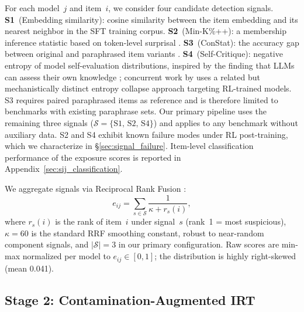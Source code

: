 For each model~$j$ and item~$i$, we consider four candidate detection signals. \textbf{S1}~(Embedding similarity): cosine similarity between the item embedding and its nearest neighbor in the SFT training corpus. \textbf{S2}~(Min-K\%++): a membership inference statistic based on token-level surprisal \citep{zhang_2024_minkpp}. \textbf{S3}~(ConStat): the accuracy gap between original and paraphrased item variants \citep{dekoninck2024constat}. \textbf{S4}~(Self-Critique): negative entropy of model self-evaluation distributions, inspired by the finding that LLMs can assess their own knowledge \citep{kadavath2022}; concurrent work by \citet{tao2025detecting} uses a related but mechanistically distinct entropy collapse approach targeting RL-trained models. S3 requires paired paraphrased items as reference and is therefore limited to benchmarks with existing paraphrase sets. Our primary pipeline uses the remaining three signals ($\mathcal{S} = \{\text{S1, S2, S4}\}$) and applies to any benchmark without auxiliary data. S2 and S4 exhibit known failure modes under RL post-training, which we characterize in \S\ref{sec:signal_failure}. Item-level classification performance of the exposure scores is reported in Appendix~\ref{sec:sij_classification}.

We aggregate signals via Reciprocal Rank Fusion \citep[RRF;][]{cormack_2009_rrf}:
\begin{equation}
\label{eq:rrf}
    e_{ij} = \sum_{s \in \mathcal{S}} \frac{1}{\kappa + r_{s}(i)},
\end{equation}
where $r_s(i)$ is the rank of item~$i$ under signal~$s$ (rank~1 = most suspicious), $\kappa=60$ is the standard RRF smoothing constant, robust to near-random component signals, and $|\mathcal{S}|=3$ in our primary configuration. Raw scores are min-max normalized per model to $e_{ij} \in [0,1]$; the distribution is highly right-skewed (mean 0.041).

\subsection{Stage 2: Contamination-Augmented IRT}
\label{sec:stage2}

